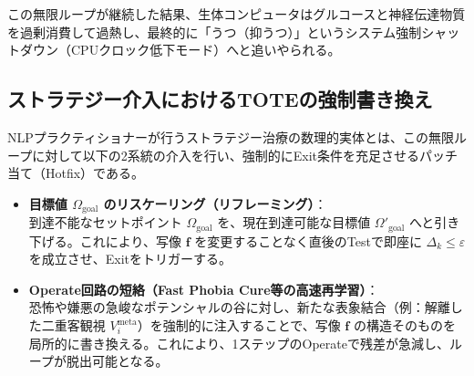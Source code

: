 この無限ループが継続した結果、生体コンピュータはグルコースと神経伝達物質を過剰消費して過熱し、最終的に「うつ（抑うつ）」というシステム強制シャットダウン（CPUクロック低下モード）へと追いやられる。

\subsection{ストラテジー介入におけるTOTEの強制書き換え}

NLPプラクティショナーが行うストラテジー治療の数理的実体とは、この無限ループに対して以下の2系統の介入を行い、強制的にExit条件を充足させるパッチ当て（Hotfix）である。

\begin{itemize}
    \item \textbf{目標値 $\Omega_{\mathrm{goal}}$ のリスケーリング（リフレーミング）}：\\
    到達不能なセットポイント $\Omega_{\mathrm{goal}}$ を、現在到達可能な目標値 $\Omega'_{\mathrm{goal}}$ へと引き下げる。これにより、写像 $\boldsymbol{f}$ を変更することなく直後のTestで即座に $\Delta_k \le \varepsilon$ を成立させ、Exitをトリガーする。
    \item \textbf{Operate回路の短絡（Fast Phobia Cure等の高速再学習）}：\\
    恐怖や嫌悪の急峻なポテンシャルの谷に対し、新たな表象結合（例：解離した二重客観視 $V_i^{\mathrm{meta}}$）を強制的に注入することで、写像 $\boldsymbol{f}$ の構造そのものを局所的に書き換える。これにより、1ステップのOperateで残差が急減し、ループが脱出可能となる。
\end{itemize}
